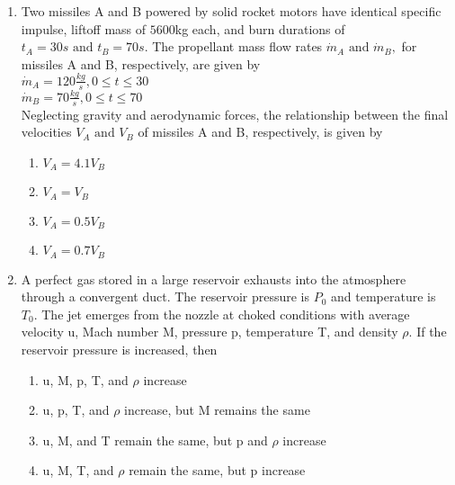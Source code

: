 \documentclass[journal]{IEEEtran}
\begin{document}
\begin{enumerate} [start=27]
\begin{figure}[!ht]
\end{figure}
\begin{enumerate}
    \item It is always possible to find a ramp setting $\theta_{RAMP}$ such that the shock still meets the cowl lip $\brak{\beta_{SHOCK}\text{ remains the same }}.$
    \item if $\theta_{RAMP}$ is held fixed, the shock angle $\beta_{SHOCK}$ will increase
    \item If M exceeds a critical value, it would NOT be possible to find a ramp setting $\theta_{RAMP}$ such that the shock still meets the cowl lip $\brak{\beta_{SHOCK}\text{ remains the same }}.$
    \item Shock angle $\beta_{SHOCK}<\sin^{-1}\brak{\frac{1}{M}}$
\end{enumerate}
\bigskip
\item Two missiles A and B powered by solid rocket motors have identical specific
impulse, liftoff mass of $5600$kg each, and burn durations of $t_{A}=30s\text{ and } t_{B}=70s.$ The propellant mass flow rates $\Dot{m}_{A}\text{ and }\Dot{m}_{B},$ for missiles A and B, respectively, are given by\\
$\Dot{m}_{A}=120\frac{kg}{s},0\leq t\leq30$\\
$\Dot{m}_{B}=70\frac{kg}{s},0\leq t\leq70$\\
Neglecting gravity and aerodynamic forces, the relationship between the final
velocities $V_{A}\text{ and }V_{B}$ of missiles A and B, respectively, is given by
\begin{enumerate}
    \item $V_{A}=4.1V_{B}$
    \item $V_{A}=V_{B}$
    \item $V_{A}=0.5V_{B}$
    \item $V_{A}=0.7V_{B}$
\end{enumerate}
\bigskip
\item A perfect gas stored in a large reservoir exhausts into the atmosphere through a convergent duct. The reservoir pressure is $P_{0}$ and temperature is $T_{0}.$  The jet emerges from the nozzle at choked conditions with average velocity u, Mach number M, pressure p, temperature T, and density $\rho.$ If the reservoir pressure is increased, then
\begin{enumerate}
    \item u, M, p, T, and $\rho$ increase
    \item u,  p, T, and $\rho$ increase, but M remains the same 
    \item u, M, and T remain the same, but p and $\rho$ increase
    \item u, M,  T, and $\rho$ remain the same, but p increase
\end{enumerate}



\end{enumerate}
\end{document}
